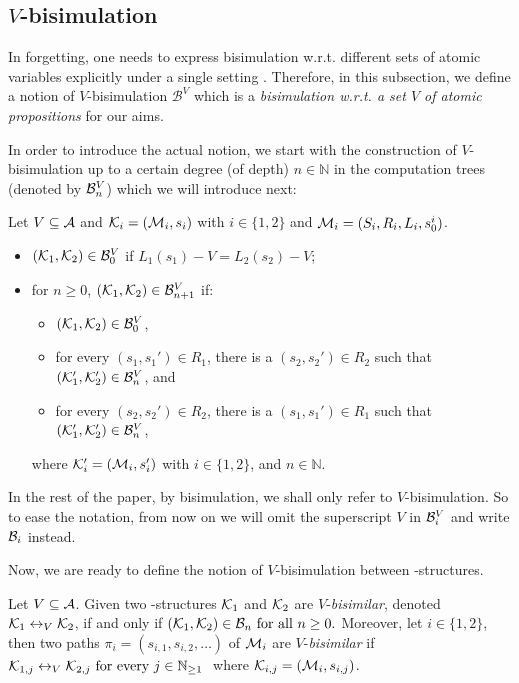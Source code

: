 \documentclass{article}
\begin{document}
\subsection{$V$-bisimulation}

In forgetting, one needs to express bisimulation w.r.t. different sets of atomic variables explicitly under a single setting \cite{Yan:AIJ:2009}. Therefore, in this subsection, we define a notion of  $V$-bisimulation $\mathcal{B}^V$ which is a \emph{bisimulation w.r.t. a set $V$ of atomic propositions} for our aims.

In order to introduce  the actual notion,  we start with  the construction of $V$-bisimulation up to a certain degree (of depth) $n \in \mathbb{N}$  in the computation trees (denoted by ${\cal B}^V_n$)  which we will introduce next:


Let $V \subseteq {\cal A}$ and ${\cal K}_i=({\cal M}_i,s_i)$ with $i\in\{1,2\}$ and ${\cal M}_i=(S_i, R_i,L_i, s_0^i)$. %
\begin{itemize}
  \item $({\cal K}_1,{\cal K}_2)\in{\cal B}_0^V$ if $L_1(s_1)- V=L_2(s_2)- V$;  %
  \item for $n\ge 0$, $({\cal K}_1,{\cal K}_2)\in{\cal B}_{n+1}^V$ if:
  \begin{itemize}
    \item $({\cal K}_1,{\cal K}_2)\in{\cal B}_0^V$,
    \item for every $(s_1,s_1')\in R_1$, there is a $(s_2,s_2')\in R_2$
    such that $({\cal K}_1',{\cal K}_2')\in {\cal B}_n^V$, and
    \item for every $(s_2,s_2')\in R_2$, there is a $(s_1,s_1')\in R_1$
    such that $({\cal K}_1',{\cal K}_2')\in {\cal B}_n^V$,
  \end{itemize}
  where ${\cal K}_i'=({\cal M}_i,s_i')$ with $i\in\{1,2\}$, and $n\in \mathbb{N}$.
\end{itemize}

In the rest of the paper, by bisimulation, we shall only refer to $V$-bisimulation. So to ease the notation, from now on we will omit the superscript $V$  in ${\cal B}_i^V$ and write ${\cal B}_i$ instead.

Now, we are ready to define the notion of $V$-bisimulation between \MPK-structures.
\begin{definition}[$V$-bisimulation]
  \label{def:V-bisimulation}
   Let $V\subseteq\cal A$. Given  two \MPK-structures ${\cal K}_1$ and ${\cal K}_2$ are $V$-{\em bisimilar},  denoted ${\cal K}_1 \leftrightarrow_V {\cal K}_2$,
 if and only if $ ({\cal K}_1,{\cal K}_2)\in {{\cal B}_n}\mbox{ for all } n\ge 0.$ Moreover, let $i\in \{1,2\}$, then two paths $\pi_i=(s_{i,1},s_{i,2},\ldots)$ of ${\cal M}_i$
 are $V$-{\em bisimilar} if
$ {\cal K}_{1,j} \leftrightarrow_V {\cal K}_{2,j}\mbox { for every $j \in  \mathbb{N}_{\geq 1}$ }$
 where ${\cal K}_{i,j}=({\cal M}_i,s_{i,j})$.
\end{definition}
\end{document}
